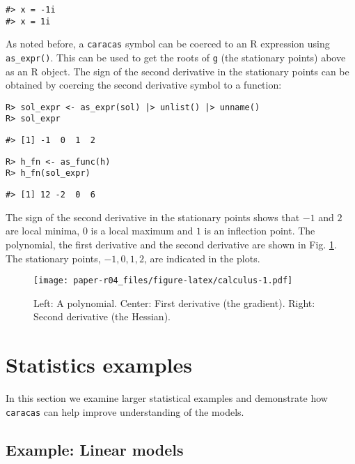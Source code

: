 \begin{verbatim}
#> x = -1i
#> x = 1i
\end{verbatim}

As noted before, a \texttt{caracas} symbol can be coerced to an R expression
using \texttt{as\_expr()}. This can be used to get the roots of \texttt{g}
(the stationary points) above as an R object.
The sign of the second derivative in the stationary points can be obtained
by coercing the second derivative symbol to a function:

\begin{verbatim}
R> sol_expr <- as_expr(sol) |> unlist() |> unname()
R> sol_expr
\end{verbatim}

\begin{verbatim}
#> [1] -1  0  1  2
\end{verbatim}

\begin{verbatim}
R> h_fn <- as_func(h)
R> h_fn(sol_expr)
\end{verbatim}

\begin{verbatim}
#> [1] 12 -2  0  6
\end{verbatim}

The sign of the second derivative in the stationary points shows that \(-1\) and
\(2\) are local minima, \(0\) is a local maximum and \(1\) is an inflection
point. The polynomial, the first derivative and the second derivative are shown in
Fig. \ref{fig:calculus}.
The stationary points, \(-1, 0, 1, 2\), are indicated in the plots.

\begin{figure}
\centering
\texttt{[image: paper-r04\_files/figure-latex/calculus-1.pdf]}
\caption{\label{fig:calculus}Left: A polynomial. Center: First derivative (the gradient). Right: Second derivative (the Hessian).}
\end{figure}

\hypertarget{statistics-examples}{%
\section{Statistics examples}\label{statistics-examples}}

In this section we examine larger statistical examples and
demonstrate how \texttt{caracas} can help improve understanding of the models.

\hypertarget{example-linear-models}{%
\subsection{Example: Linear models}\label{example-linear-models}}

